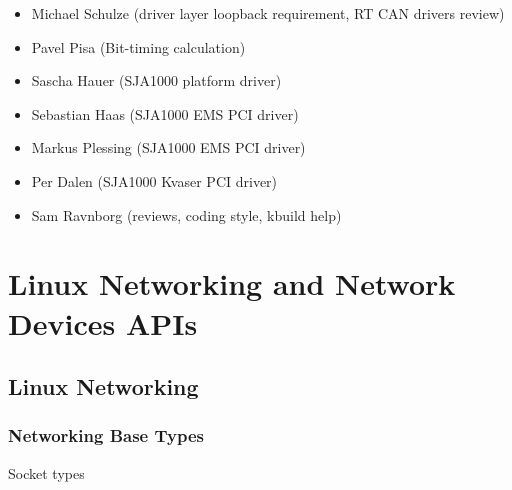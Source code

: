 \documentclass[a4paper,8pt,english]{sphinxmanual}
\begin{document}
\begin{itemize}
\item {} 
Michael Schulze (driver layer loopback requirement, RT CAN drivers review)

\item {} 
Pavel Pisa (Bit-timing calculation)

\item {} 
Sascha Hauer (SJA1000 platform driver)

\item {} 
Sebastian Haas (SJA1000 EMS PCI driver)

\item {} 
Markus Plessing (SJA1000 EMS PCI driver)

\item {} 
Per Dalen (SJA1000 Kvaser PCI driver)

\item {} 
Sam Ravnborg (reviews, coding style, kbuild help)

\end{itemize}


\chapter{Linux Networking and Network Devices APIs}
\label{networking/kapi:linux-networking-and-network-devices-apis}\label{networking/kapi::doc}

\section{Linux Networking}
\label{networking/kapi:linux-networking}

\subsection{Networking Base Types}
\label{networking/kapi:networking-base-types}

\begin{fulllineitems}
\label{networking/kapi:c.sock_type}
Socket types

\end{fulllineitems}
\end{document}
